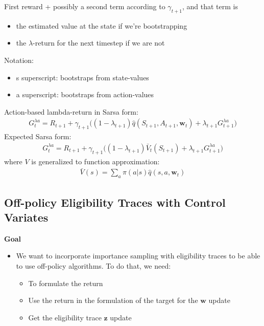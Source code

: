 \documentclass[sutton_barto_notes.tex]{subfiles}
\begin{document}
 First reward + possibly a second term according to $\gamma_{t+1}$, and that term is 
\begin{itemize}
\item the estimated value at the state if we’re bootstrapping 
\item the $\lambda$-return for the next timestep if we are not 
\end{itemize}
 Notation: 
\begin{itemize}
\item s superscript: bootstraps from state-values 
\item a superscript: bootstraps from action-values 
\end{itemize}
 Action-based lambda-return in Sarsa form: 
\begin{align}
G_t^{\lambda a} = R_{t+1} + \gamma_{t+1} \big( (1 - \lambda_{t+1}) \hat{q}(S_{t+1}, A_{t+1}, \mathbf{w}_{t}) + \lambda_{t+1} G_{t+1}^{\lambda a}\big) \label{eq:12.19}\tag{12.19}
\end{align}
 Expected Sarsa form: 
\begin{align}
G_t^{\lambda a} = R_{t+1} + \gamma_{t+1} \big( (1 - \lambda_{t+1}) \bar{V}_t(S_{t+1}) + \lambda_{t+1} G_{t+1}^{\lambda a}\big) \label{eq:12.20}\tag{12.20}
\end{align}
 where $V$ is generalized to function approximation: 
\begin{align}
\bar{V}(s) = \sum_a \pi(a|s) \hat{q}(s, a, \mathbf{w}_{t}) \label{eq:12.21}\tag{12.21}
\end{align}

\subsection{Off-policy Eligibility Traces with Control Variates}

 \textbf{Goal} 
\begin{itemize}
\item We want to incorporate importance sampling with eligibility traces to be able to use off-policy algorithms. To do that, we need:
    \begin{itemize}
    \item To formulate the return 
    \item Use the return in the formulation of the target for the $\mathbf{w}$ update 
    \item Get the eligibility trace $\mathbf{z}$ update 
    \end{itemize}
\end{itemize}
\end{document}
